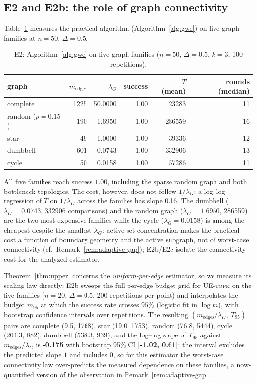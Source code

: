 \documentclass[11pt]{article}
\theoremstyle{definition}
\newcommand{\lG}{\lambda_G}
\begin{document}
\subsection{E2 and E2b: the role of graph connectivity}

Table~\ref{tab:e2} measures the practical algorithm (Algorithm~\ref{alg:gwe}) on five graph families at $n=50$, $\Delta=0.5$.

\begin{table}[t]
\centering\small
\caption{E2: Algorithm~\ref{alg:gwe} on five graph families ($n=50$, $\Delta=0.5$, $k=3$, 100 repetitions).}
\label{tab:e2}
\begin{tabular}{lrrrrr}
\toprule
graph & $m_{\mathrm{edges}}$ & $\lG$ & success & $T$ (mean) & rounds (median) \\
\midrule
complete & 1225 & 50.0000 & 1.00 & 23283 & 11 \\
random ($p{=}0.15$) & 190 & 1.6950 & 1.00 & 286559 & 16 \\
star & 49 & 1.0000 & 1.00 & 39336 & 12 \\
dumbbell & 601 & 0.0743 & 1.00 & 332906 & 13 \\
cycle & 50 & 0.0158 & 1.00 & 57286 & 11 \\
\bottomrule
\end{tabular}
\end{table}

All five families reach success $1.00$, including the sparse random graph and both bottleneck topologies.  The cost, however, does not follow $1/\lG$: a log--log regression of $T$ on $1/\lG$ across the families has slope 0.16.  The dumbbell ($\lG=0.0743$, 332906 comparisons) and the random graph ($\lG=1.6950$, 286559) are the two most expensive families while the cycle ($\lG=0.0158$) is among the cheapest despite the smallest $\lG$: active-set concentration makes the practical cost a function of boundary geometry and the active subgraph, not of worst-case connectivity (cf.\ Remark~\ref{rem:adaptive-gap}); E2b/E2c isolate the connectivity cost for the analyzed estimator.

Theorem~\ref{thm:upper} concerns the \emph{uniform-per-edge} estimator, so we measure its scaling law directly: E2b sweeps the full per-edge budget grid for \textsc{UE-topk} on the five families ($n=20$, $\Delta=0.5$, 200 repetitions per point) and interpolates the budget $m_{95}$ at which the success rate crosses $95\%$ (logistic fit in $\log m$), with bootstrap confidence intervals over repetitions.  The resulting $(m_{\mathrm{edges}}/\lG,\ T_{95})$ pairs are complete (9.5, 1768), star (19.0, 1753), random (76.8, 5444), cycle (204.3, 882), dumbbell (538.3, 939), and the log--log slope of $T_{95}$ against $m_{\mathrm{edges}}/\lG$ is \textbf{-0.175} with bootstrap 95\% CI \textbf{[-1.02, 0.61]}: the interval excludes the predicted slope $1$ and includes $0$, so for this estimator the worst-case connectivity law over-predicts the measured dependence on these families, a now-quantified version of the observation in Remark~\ref{rem:adaptive-gap}.
\end{document}
